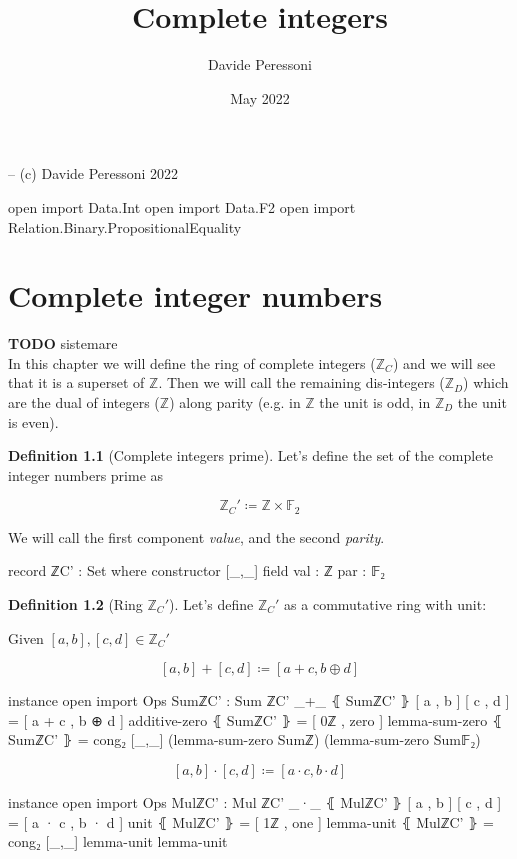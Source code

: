 \documentclass[a4paper]{report}
\title{Complete integers}
\author{Davide Peressoni}
\date{May 2022}
\theoremstyle{definition}
\newtheorem{definition}{Definition}
\newcommand\bZ{\mathbb{Z}}
\newcommand\bF{\mathbb{F}}
\begin{document}
\maketitle

\begin{code}
-- (c) Davide Peressoni 2022

open import Data.Int
open import Data.F2
open import Relation.Binary.PropositionalEquality
\end{code}

\chapter{Complete integer numbers}

\textbf{TODO} sistemare\\
In this chapter we will define the ring of complete integers ($\bZ_C$) and we will
see that it is a superset of $\bZ$. Then we will call the remaining dis-integers
($\bZ_D$) which are the dual of integers ($\bZ$) along parity (e.g. in $\bZ$ the unit is
odd, in $\bZ_D$ the unit is even).

\begin{definition}[Complete integers prime]
Let's define the set of the complete integer numbers prime as

\[\bZ_C' \coloneqq \bZ\times\bF_2\]

We will call the first component \emph{value}, and the second \emph{parity}.

\begin{code}
record ℤC' : Set where
  constructor [_,_]
  field
    val : ℤ
    par : 𝔽₂
\end{code}
\end{definition}

\begin{definition}[Ring $\bZ_C'$]
Let's define $\bZ_C'$ as a commutative ring with unit:

Given $[a,b], [c,d] \in \bZ_C'$

\[[a,b] + [c,d] \coloneqq [a+c, b\oplus d]\]

\begin{code}
instance
  open import Ops
  SumℤC' : Sum ℤC'
  _+_ ⦃ SumℤC' ⦄ [ a , b ] [ c , d ] = [ a + c , b ⊕ d ]
  additive-zero ⦃ SumℤC' ⦄ = [ 0ℤ , zero ]
  lemma-sum-zero ⦃ SumℤC' ⦄ = cong₂ [_,_] (lemma-sum-zero Sumℤ) (lemma-sum-zero Sum𝔽₂)
\end{code}

\[[a,b] \cdot [c,d] \coloneqq [a\cdot c, b\cdot d]\]

\begin{code}
instance
  open import Ops
  MulℤC' : Mul ℤC'
  _·_ ⦃ MulℤC' ⦄ [ a , b ] [ c , d ] = [ a · c , b · d ]
  unit ⦃ MulℤC' ⦄ = [ 1ℤ , one ]
  lemma-unit ⦃ MulℤC' ⦄ = cong₂ [_,_] lemma-unit lemma-unit
\end{code}
\end{definition}
\end{document}
